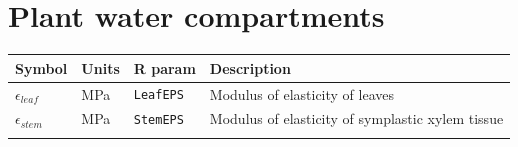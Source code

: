 \documentclass[]{book}
\begin{document}
\section{Plant water compartments}\label{plant-water-compartments}

\begin{longtable}[]{@{}llll@{}}
\toprule
\begin{minipage}[b]{0.11\columnwidth}\raggedright\strut
Symbol\strut
\end{minipage} & \begin{minipage}[b]{0.10\columnwidth}\raggedright\strut
Units\strut
\end{minipage} & \begin{minipage}[b]{0.12\columnwidth}\raggedright\strut
R param\strut
\end{minipage} & \begin{minipage}[b]{0.45\columnwidth}\raggedright\strut
Description\strut
\end{minipage}\tabularnewline
\midrule
\endhead
\begin{minipage}[t]{0.11\columnwidth}\raggedright\strut
\(\epsilon_{leaf}\)\strut
\end{minipage} & \begin{minipage}[t]{0.10\columnwidth}\raggedright\strut
MPa\strut
\end{minipage} & \begin{minipage}[t]{0.12\columnwidth}\raggedright\strut
\texttt{LeafEPS}\strut
\end{minipage} & \begin{minipage}[t]{0.45\columnwidth}\raggedright\strut
Modulus of elasticity of leaves\strut
\end{minipage}\tabularnewline
\begin{minipage}[t]{0.11\columnwidth}\raggedright\strut
\(\epsilon_{stem}\)\strut
\end{minipage} & \begin{minipage}[t]{0.10\columnwidth}\raggedright\strut
MPa\strut
\end{minipage} & \begin{minipage}[t]{0.12\columnwidth}\raggedright\strut
\texttt{StemEPS}\strut
\end{minipage} & \begin{minipage}[t]{0.45\columnwidth}\raggedright\strut
Modulus of elasticity of symplastic xylem tissue\strut
\end{minipage}\tabularnewline
\begin{minipage}[t]{0.11\columnwidth}\raggedright\strut

\end{minipage}
\end{longtable}
\end{document}
